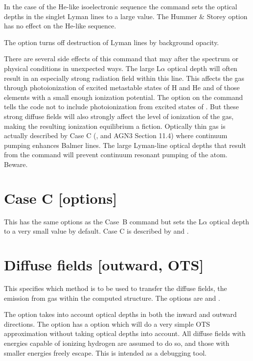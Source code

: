 In the case of the He-like isoelectronic sequence
the  command
sets the optical depths in the singlet Lyman lines to a large value.
The
Hummer \& Storey option has no effect on the He-like sequence.

The  option turns off destruction of
Lyman lines by background opacity.

There are several side effects of this command that may after the spectrum
or physical conditions in unexpected ways.
The large L$\alpha $ optical depth will
often result in an especially strong radiation field within this line.
This affects the gas through photoionization of excited metastable states
of H and He and of those elements
with a small enough ionization potential.
The  option on the 
command tells the code not to
include photoionization from excited states of \hO.
But these strong diffuse fields will also strongly affect the level
of ionization of the gas, making the resulting ionization equilibrium a
fiction.
Optically thin gas is actually described by Case C
(\citealp{Ferland1999}, \citealp{LuridianaEtAl09} and
AGN3 Section 11.4) where continuum pumping enhances Balmer lines.
The large
Lyman-line optical depths that result from the 
command will prevent
continuum resonant pumping of the atom.  Beware.

\section{Case C [options]}

This has the same options as the Case~B command but sets the
L$\alpha$ optical depth to a very small value by default.
Case C is described by \citet{Ferland1999} and
\citet{LuridianaEtAl09}.

\section{Diffuse fields [outward, OTS]}

This specifies which method is to be used to transfer the diffuse fields,
the emission from gas within the computed structure.
The options are  and .

The  option takes into account optical depths
in both the inward and outward directions.
The  option has a  option which will
do a very simple OTS approximation without taking optical depths into
account.
All diffuse fields with energies capable of ionizing hydrogen
are assumed to do so, and those with smaller energies freely escape.
This is intended as a debugging tool.

